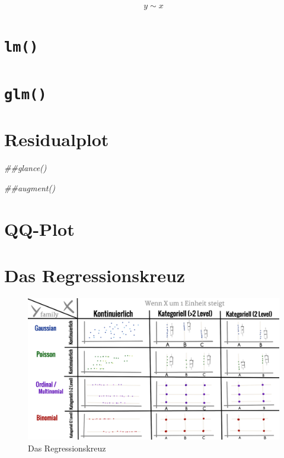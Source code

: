 \documentclass[
  letterpaper,
  DIV=11,
  oneside]{scrreport}
\newenvironment{Shaded}{\begin{snugshade}}{\end{snugshade}}
\newcommand{\DocumentationTok}[1]{\textcolor[rgb]{0.37,0.37,0.37}{\textit{#1}}}
\begin{document}
\[
y \sim x
\]

\hypertarget{lm}{%
\section*{\texorpdfstring{\texttt{lm()}}{lm()}}\label{lm}}

\hypertarget{glm}{%
\section*{\texorpdfstring{\texttt{glm()}}{glm()}}\label{glm}}

\hypertarget{residualplot}{%
\section*{Residualplot}\label{residualplot}}

\begin{Shaded}
\begin{Highlighting}[]
\DocumentationTok{\#\#glance()}

\DocumentationTok{\#\#augment()}
\end{Highlighting}
\end{Shaded}

\hypertarget{qq-plot}{%
\section*{QQ-Plot}\label{qq-plot}}

\hypertarget{das-regressionskreuz}{%
\section*{Das Regressionskreuz}\label{das-regressionskreuz}}

\begin{figure}

{\centering \includegraphics[width=1\textwidth,height=\textheight]{./images/Regressionskreut_advanced.png}

}

\caption{\label{fig-reg-cross}Das Regressionskreuz}

\end{figure}
\end{document}
